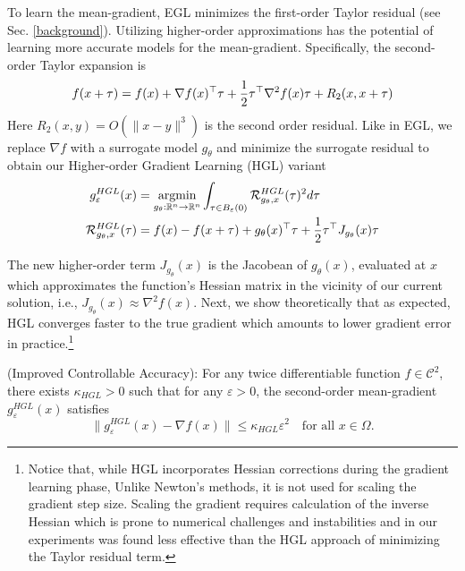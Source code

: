 To learn the mean-gradient, EGL minimizes the first-order Taylor residual (see Sec. \ref{background}). Utilizing higher-order approximations has the potential of learning more accurate models for the mean-gradient. Specifically, the second-order Taylor expansion is
\begin{equation}
\label{gradient_training_formula}
f(x + \tau) = f(x) + \nabla f(x)^\top \tau + \frac{1}{2} \tau^\top \nabla^2 f(x) \tau + R_2(x,x + \tau) \notag
\end{equation} 
Here \(R_2(x,y)=O(\|x-y\|^3)\) is the second order residual. Like in EGL, we replace \(\nabla f\) with a surrogate model \(g_{\theta}\) and minimize the surrogate residual to obtain our Higher-order Gradient Learning (HGL) variant
\begin{align}
g^{HGL}_{\varepsilon}(x) &= \operatorname*{argmin}_{g_{\theta}:\mathbb{R}^n \rightarrow \mathbb{R}^n} \int_{\tau \in B_\varepsilon(0)}\mathcal{R}_{g_\theta, x}^{HGL}(\tau)^2d\tau \\
\mathcal{R}_{g_\theta, x}^{HGL}(\tau) &= f(x) - f(x + \tau) + g_{\theta}(x)^\top \tau + \frac{1}{2}\tau^\top J_{g_{\theta}}(x) \tau \notag
\end{align}

The new higher-order term \(J_{g_{\theta}}(x)\) is the Jacobean of $g_{\theta}(x)$, evaluated at $x$ which approximates the function's Hessian matrix in the vicinity of our current solution, i.e., $J_{g_{\theta}}(x) \approx \nabla^2 f(x)$. Next, we show theoretically that as expected, HGL converges faster to the true gradient which amounts to lower gradient error in practice.\footnote{Notice that, while HGL incorporates Hessian corrections during the gradient learning phase, 
Unlike  Newton’s methods, it is not used for scaling the gradient step size. Scaling the gradient requires calculation of the inverse Hessian
which is prone to numerical challenges and instabilities and in our experiments was found less effective than the HGL approach of minimizing the Taylor residual term.}
\begin{theorem} (Improved Controllable Accuracy):
For any twice differentiable function \( f \in \mathcal{C}^2 \), there exists \( \kappa_{HGL} > 0 \) such that for any \( \varepsilon > 0 \), the second-order mean-gradient \( g^{HGL}_{\varepsilon}(x) \) satisfies
\[
\| g^{HGL}_{\varepsilon}(x) - \nabla f(x) \| \leq \kappa_{HGL}\varepsilon^2 \quad \text{for all } x \in \Omega.
\]
\end{theorem}

